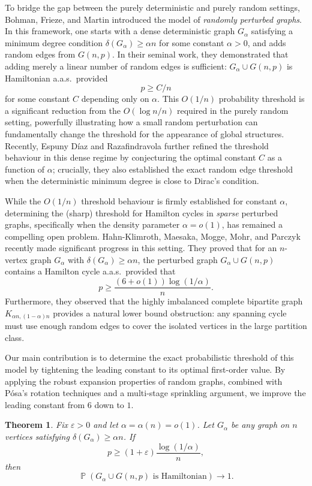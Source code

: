 \documentclass[11pt,reqno]{amsart}
\newtheorem{theorem}{Theorem}[section]
\theoremstyle{definition}
\theoremstyle{remark}
\renewcommand\Pr{\operatorname{\mathbb{P}}}
\renewcommand\ge{\geqslant}
\renewcommand\to{\rightarrow}
\begin{document}
To bridge the gap between the purely deterministic and purely random settings, Bohman, Frieze, and Martin \cite{BFM} introduced the model of \emph{randomly perturbed graphs}. In this framework, one starts with a dense deterministic graph $G_\alpha$ satisfying a minimum degree condition $\delta(G_\alpha) \ge \alpha n$ for some constant $\alpha > 0$, and adds random edges from $G(n,p)$. In their seminal work, they demonstrated that adding merely a linear number of random edges is sufficient: $G_\alpha \cup G(n,p)$ is Hamiltonian a.a.s.\ provided 
$$p \ge C/n$$
for some constant $C$ depending only on $\alpha$. This $O(1/n)$ probability threshold is a significant reduction from the $O(\log n / n)$ required in the purely random setting, powerfully illustrating how a small random perturbation can fundamentally change the threshold for the appearance of global structures. Recently, Espuny D\'iaz and Razafindravola \cite{ER} further refined the threshold behaviour in this dense regime by conjecturing the optimal constant $C$ as a function of $\alpha$; crucially, they also established the exact random edge threshold when the deterministic minimum degree is close to Dirac's condition.

While the $O(1/n)$ threshold behaviour is firmly established for constant $\alpha$, determining the (sharp) threshold for Hamilton cycles in \emph{sparse} perturbed graphs, specifically when the density parameter $\alpha = o(1)$, has remained a compelling open problem. Hahn-Klimroth, Maesaka, Mogge, Mohr, and Parczyk \cite{HMMMP} recently made significant progress in this setting. They proved that for an $n$-vertex graph $G_\alpha$ with $\delta(G_\alpha) \ge \alpha n$, the perturbed graph $G_\alpha \cup G(n, p)$ contains a Hamilton cycle a.a.s.\ provided that 
$$p \ge \frac{(6+o(1))\log(1/\alpha)}{n}.$$  
Furthermore, they observed that the highly imbalanced complete bipartite graph $K_{\alpha n, (1-\alpha)n}$ provides a natural lower bound obstruction: any spanning cycle must use enough random edges to cover the isolated vertices in the large partition class.

Our main contribution is to determine the exact probabilistic threshold of this model by tightening the leading constant to its optimal first-order value. By applying the robust expansion properties of random graphs, combined with P\'osa's rotation techniques and a multi-stage sprinkling argument, we improve the leading constant from $6$ down to $1$. 

\begin{theorem}\label{thm:main}
Fix $\varepsilon>0$ and let $\alpha=\alpha(n)=o(1)$. Let $G_\alpha$ be any graph on $n$ vertices satisfying $\delta(G_\alpha)\ge\alpha n$. If
$$p\ge(1+\varepsilon)\frac{\log(1/\alpha)}{n},$$
then
$$\Pr(G_\alpha\cup G(n,p) \text{ is Hamiltonian}) \to 1.$$
\end{theorem}
\end{document}
